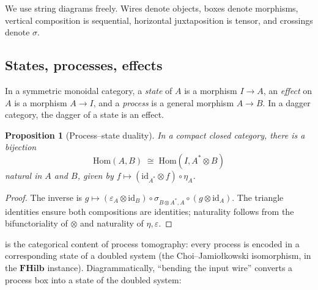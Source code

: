 \documentclass[12pt]{article}
\newtheorem{proposition}[theorem]{Proposition}
\theoremstyle{definition}
\theoremstyle{remark}
\newcommand{\FHilb}{\mathbf{FHilb}}
\newcommand{\id}{\mathrm{id}}
\newcommand{\Hom}{\mathrm{Hom}}
\begin{document}
We use string diagrams freely. Wires denote objects, boxes denote morphisms, vertical composition is sequential, horizontal juxtaposition is tensor, and crossings denote $\sigma$.

\subsection{States, processes, effects}

In a symmetric monoidal category, a \emph{state} of $A$ is a morphism $I \to A$, an \emph{effect} on $A$ is a morphism $A \to I$, and a \emph{process} is a general morphism $A \to B$. In a dagger category, the dagger of a state is an effect.

\begin{proposition}[Process--state duality]
\label{prop:process-state}
In a compact closed category, there is a bijection
\[
\Hom(A, B) \;\cong\; \Hom(I, A^* \otimes B)
\]
natural in $A$ and $B$, given by $f \mapsto (\id_{A^*} \otimes f) \circ \eta_A$.
\end{proposition}

\begin{proof}
The inverse is $g \mapsto (\varepsilon_A \otimes \id_B) \circ \sigma_{B \otimes A^*, A} \circ (g \otimes \id_A)$. The triangle identities ensure both compositions are identities; naturality follows from the bifunctoriality of $\otimes$ and naturality of $\eta, \varepsilon$.
\end{proof}

 is the categorical content of process tomography: every process is encoded in a corresponding state of a doubled system (the Choi--Jamio\l{}kowski isomorphism, in the $\FHilb$ instance). Diagrammatically, ``bending the input wire'' converts a process box into a state of the doubled system:
\begin{center}
\end{center}
\end{document}

